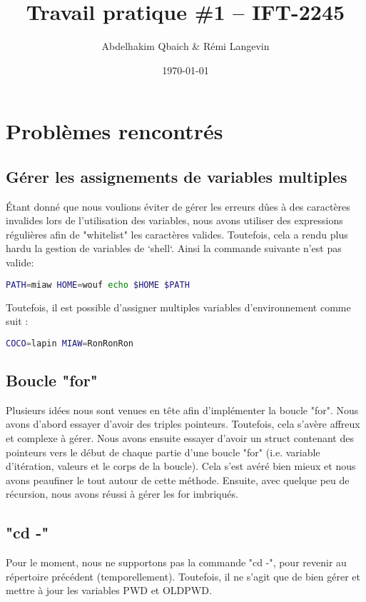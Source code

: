 \documentclass[a4paper]{article}
\title{Travail pratique \#1 -- IFT-2245}
\author{Abdelhakim Qbaich & Rémi Langevin}
\date{\today}
\begin{document}
\maketitle

\section*{Probl\`emes rencontr\'es}
    \subsection*{G\'erer les assignements de variables multiples}
        \'Etant donn\'e que nous voulions \'eviter de g\'erer les erreurs d\^ues \`a des caract\`eres invalides
        lors de l'utilisation des variables, nous avons utiliser des expressions r\'eguli\`eres afin de 
        "whitelist" les caract\`eres valides. Toutefois, cela a rendu plus hardu la gestion de variables de `shell`.
        Ainsi la commande suivante n'est pas valide:
        \begin{lstlisting}[language=bash]
PATH=miaw HOME=wouf echo $HOME $PATH
        \end{lstlisting}
        Toutefois, il est possible d'assigner multiples variables d'environnement comme suit :
        \begin{lstlisting}[language=bash]
COCO=lapin MIAW=RonRonRon
        \end{lstlisting}

    \subsection*{Boucle "for"}
        Plusieurs id\'ees nous sont venues en t\^ete afin d'impl\'ementer la boucle "for". Nous avons d'abord
        essayer d'avoir des triples pointeurs. Toutefois, cela s'av\`ere affreux et complexe \`a g\'erer.
        Nous avons ensuite essayer d'avoir un struct contenant des pointeurs vers le d\'ebut de chaque partie
        d'une boucle "for" (i.e. variable d'it\'eration, valeurs et le corps de la boucle). Cela s'est av\'er\'e
        bien mieux et nous avons peaufiner le tout autour de cette m\'ethode. Ensuite, avec quelque peu de
        r\'ecursion, nous avons r\'eussi \`a g\'erer les for imbriqu\'es.
    \subsection*{"cd -"}
        Pour le moment, nous ne supportons pas la commande "cd -", pour revenir au r\'epertoire pr\'ec\'edent
        (temporellement). Toutefois, il ne s'agit que de bien g\'erer et mettre \`a jour les variables PWD et 
        OLDPWD.
\end{document}
